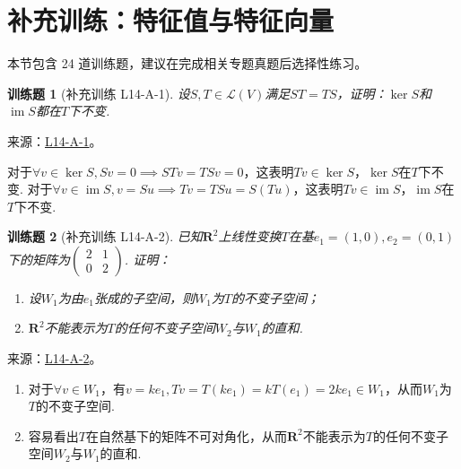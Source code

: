 \documentclass[UTF8,12pt,a4paper,fontset=fandol]{ctexart}
\newtheorem{exercise}{训练题}[section]
\begin{document}
\section{补充训练：特征值与特征向量}

本节包含 24 道训练题，建议在完成相关专题真题后选择性练习。

\begin{exercise}[补充训练 L14-A-1]\label{prob:L14-A-1}
设$S,T\in \mathcal{L}(V)$满足$ST=TS$，证明：$\ker S$和$\operatorname{im} S$都在$T$下不变.
\end{exercise}
\noindent 来源：\href{https://github.com/yhwu-is/Linear-Algebra-Left-Undone/blob/new/%E8%AE%B2%E4%B9%89/%E4%B8%93%E9%A2%98/14%20%E7%9B%B8%E4%BC%BC%E6%A0%87%E5%87%86%E5%BD%A2%EF%BC%9A%E5%8A%A8%E6%9C%BA%E4%B8%8E%E5%9F%BA%E7%A1%80.tex}{L14-A-1}。
\begin{solve}
对于$\forall v\in\ker S,Sv=0\implies STv=TSv=0$，这表明$Tv\in \ker S$，$\ker S$在$T$下不变.
            对于$\forall v \in \operatorname{im} S,v=Su\implies Tv=TSu=S(Tu)$，这表明$Tv \in \operatorname{im} S$，$\operatorname{im} S$在$T$下不变.
\end{solve}

\begin{exercise}[补充训练 L14-A-2]\label{prob:L14-A-2}
已知$\mathbf{R}^2$上线性变换$T$在基$e_1=(1,0),e_2=(0,1)$下的矩阵为$\begin{pmatrix}2 & 1 \\ 0 & 2\end{pmatrix}$. 证明：
        \begin{enumerate}
            \item 设$W_1$为由$e_1$张成的子空间，则$W_1$为$T$的不变子空间；

            \item $\mathbf{R}^2$不能表示为$T$的任何不变子空间$W_2$与$W_1$的直和.
        \end{enumerate}
\end{exercise}
\noindent 来源：\href{https://github.com/yhwu-is/Linear-Algebra-Left-Undone/blob/new/%E8%AE%B2%E4%B9%89/%E4%B8%93%E9%A2%98/14%20%E7%9B%B8%E4%BC%BC%E6%A0%87%E5%87%86%E5%BD%A2%EF%BC%9A%E5%8A%A8%E6%9C%BA%E4%B8%8E%E5%9F%BA%E7%A1%80.tex}{L14-A-2}。
\begin{solve}
\begin{enumerate}
                \item 对于$\forall v\in W_1$，有$v=ke_1,Tv=T(ke_1)=kT(e_1)=2ke_1\in W_1$，从而$W_1$为$T$的不变子空间.
                \item 容易看出$T$在自然基下的矩阵不可对角化，从而$\mathbf{R}^2$不能表示为$T$的任何不变子空间$W_2$与$W_1$的直和.
            \end{enumerate}
\end{solve}
\end{document}
